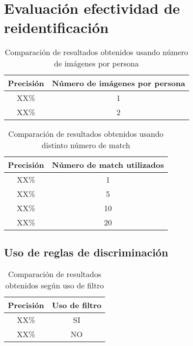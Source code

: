 \documentclass[../memoria.tex]{subfiles}
\begin{document}
\section{Evaluación efectividad de reidentificación}

\begin{table}
	\begin{center}
		\begin{tabular}{cc}
			Precisión & Número de imágenes por persona  \\
			\hline
			XX\% & 1 \\
			XX\% & 2 \\
		\end{tabular}  
	\end{center}
	\caption{Comparación de resultados obtenidos usando número de imágenes por persona}
\label{experimentos numero de imagenes por persona}
\end{table}

\begin{table}
	\begin{center}
		\begin{tabular}{cc}
			Precisión & Número de match utilizados  \\
			\hline
			XX\% & 1 \\
			XX\% & 5 \\
			XX\% & 10 \\
			XX\% & 20 \\
		\end{tabular}  
	\end{center}
	\caption{Comparación de resultados obtenidos usando distinto número de match}
\label{experimentos numero de match}
\end{table}

\subsection{Uso de reglas de discriminación}

\begin{table}
	\begin{center}
		\begin{tabular}{cc}
			Precisión & Uso de filtro  \\
			\hline
			XX\% & SI \\
			XX\% & NO \\
		\end{tabular}  
	\end{center}
	\caption{Comparación de resultados obtenidos según uso de filtro }
\label{experimentos uso filtro area}
\end{table}
\end{document}
